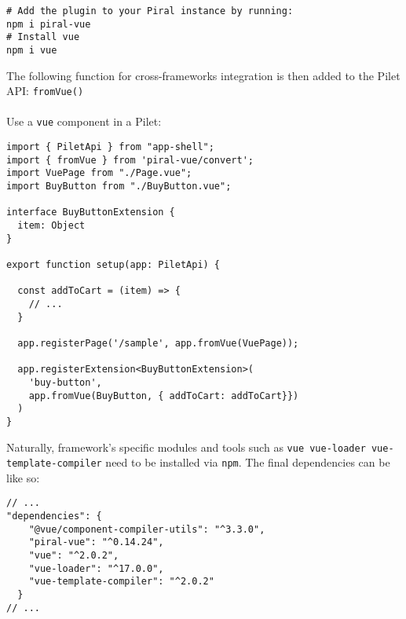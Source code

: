 \documentclass[a4paper]{book}
\begin{document}
\begin{lstlisting}[caption={Setup to integrate Vue components in a Pilet}]
# Add the plugin to your Piral instance by running:
npm i piral-vue
# Install vue
npm i vue

\end{lstlisting}
The following function for cross-frameworks integration is then added to the Pilet API: \verb|fromVue()|
\\ \\
Use a \verb|vue| component in a Pilet:

\begin{lstlisting}[caption={Piral docs Vue plugin \url{https://docs.piral.io/plugins/piral-vue/overview}}]
import { PiletApi } from "app-shell";
import { fromVue } from 'piral-vue/convert';
import VuePage from "./Page.vue";
import BuyButton from "./BuyButton.vue";

interface BuyButtonExtension {
  item: Object
}

export function setup(app: PiletApi) {

  const addToCart = (item) => {
    // ...
  }
  
  app.registerPage('/sample', app.fromVue(VuePage));
  
  app.registerExtension<BuyButtonExtension>(
    'buy-button', 
    app.fromVue(BuyButton, { addToCart: addToCart}})
  )
}

\end{lstlisting}





Naturally, framework's specific modules and tools such as \verb|vue vue-loader vue-template-compiler| need to be installed via \verb|npm|. The final dependencies can be like so:
\begin{lstlisting}[caption={Vue realted dependencies in a Pilet}]
// ...
"dependencies": {
    "@vue/component-compiler-utils": "^3.3.0",
    "piral-vue": "^0.14.24",
    "vue": "^2.0.2",
    "vue-loader": "^17.0.0",
    "vue-template-compiler": "^2.0.2"
  }
// ...

\end{lstlisting}
\end{document}
